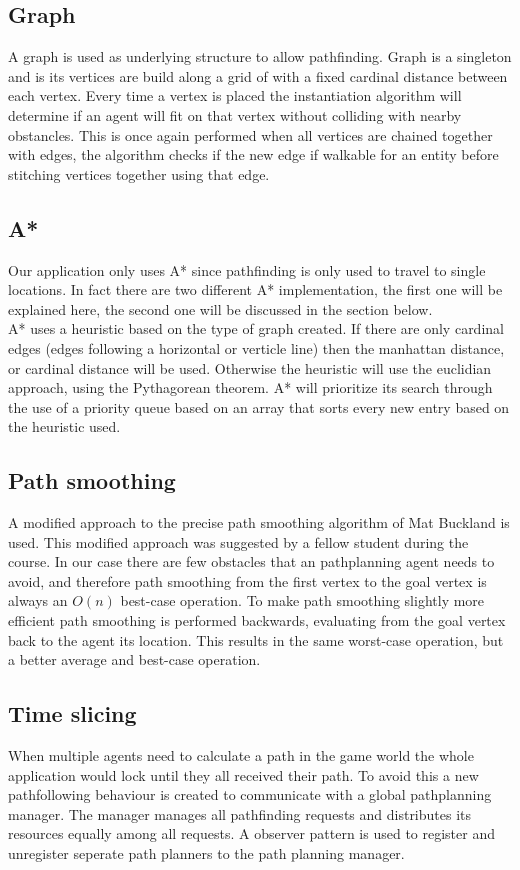 \documentclass[10pt]{article}
\begin{document}
   \subsection {Graph}
  A graph is used as underlying structure to allow pathfinding. Graph is a singleton and is its vertices are build along a grid of with a fixed cardinal distance between each vertex. Every time a vertex is placed the instantiation algorithm will determine if an agent will fit on that vertex without colliding with nearby obstancles. This is once again performed when all vertices are chained together with edges, the algorithm checks if the new edge if walkable for an entity before stitching vertices together using that edge.
   \subsection {A*}
  Our application only uses A* since pathfinding is only used to travel to single locations. In fact there are two different A* implementation, the first one will be explained here, the second one will be discussed in the section below. \\
  A* uses a heuristic based on the type of graph created. If there are only cardinal edges (edges following a horizontal or verticle line) then the manhattan distance, or cardinal distance will be used. Otherwise the heuristic will use the euclidian approach, using the Pythagorean theorem. A* will prioritize its search through the use of a priority queue based on an array that sorts every new entry based on the heuristic used. 
   \subsection {Path smoothing}
A modified approach to the precise path smoothing algorithm of Mat Buckland \cite{pgaie} is used. This modified approach was suggested by a fellow student during the course. In our case there are few obstacles that an pathplanning agent needs to avoid, and therefore path smoothing from the first vertex to the goal vertex is always an \(O(n)\) best-case operation. To make path smoothing slightly more efficient path smoothing is performed backwards, evaluating from the goal vertex back to the agent its location. This results in the same worst-case operation, but a better average and best-case operation.
   \subsection {Time slicing}
  When multiple agents need to calculate a path in the game world the whole application would lock until they all received their path. To avoid this a new pathfollowing behaviour is created to communicate with a global pathplanning manager. The manager manages all pathfinding requests and distributes its resources equally among all requests. A observer pattern is used to register and unregister seperate path planners to the path planning manager.
   
\end{document}

